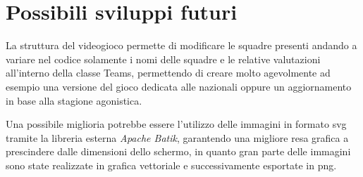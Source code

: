 \documentclass[12pt,a4paper]{report}
\begin{document}
\chapter{Possibili sviluppi futuri}\label{ch:conc-svil-fut}
La struttura del videogioco permette di modificare le squadre presenti andando a variare nel codice solamente i nomi delle squadre e le relative valutazioni all'interno della classe Teams, permettendo di creare molto agevolmente ad esempio una versione del gioco dedicata alle nazionali oppure un aggiornamento in base alla stagione agonistica.

Una possibile miglioria potrebbe essere l'utilizzo delle immagini in formato svg tramite la libreria esterna \emph{Apache Batik}, garantendo una migliore resa grafica a prescindere dalle dimensioni dello schermo, in quanto gran parte delle immagini sono state realizzate in grafica vettoriale e successivamente esportate in png.

\end{document}
